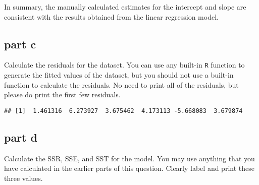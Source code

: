 \documentclass[
]{article}
\newenvironment{Shaded}{\begin{snugshade}}{\end{snugshade}}
\newcommand{\DecValTok}[1]{\textcolor[rgb]{0.00,0.00,0.81}{#1}}
\newcommand{\FunctionTok}[1]{\textcolor[rgb]{0.13,0.29,0.53}{\textbf{#1}}}
\newcommand{\NormalTok}[1]{#1}
\newcommand{\OtherTok}[1]{\textcolor[rgb]{0.56,0.35,0.01}{#1}}
\newcommand{\SpecialCharTok}[1]{\textcolor[rgb]{0.81,0.36,0.00}{\textbf{#1}}}
\begin{document}
In summary, the manually calculated estimates for the intercept and
slope are consistent with the results obtained from the linear
regression model.

\subsection{part c}\label{part-c-1}

Calculate the residuals for the dataset. You can use any built-in
\texttt{R} function to generate the fitted values of the dataset, but
you should not use a built-in function to calculate the residuals. No
need to print all of the residuals, but please do print the first few
residuals.

\begin{Shaded}
\end{Shaded}

\begin{verbatim}
## [1]  1.461316  6.273927  3.675462  4.173113 -5.668083  3.679874
\end{verbatim}

\subsection{part d}\label{part-d-1}

Calculate the SSR, SSE, and SST for the model. You may use anything that
you have calculated in the earlier parts of this question. Clearly label
and print these three values.

\begin{Shaded}
\end{Shaded}
\end{document}
